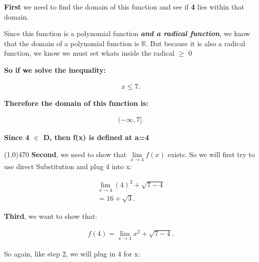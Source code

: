 \documentclass{report}
\begin{document}
        \bigbreak \noindent 
        \textbf{First} we need to find the domain of this function and see if \textbf{4} lies within
        that domain.

        \bigbreak \noindent 
        Since this function is a polynomial function \textbf{\textit{and a radical function}}, 
        we know that the domain of a polynomial function is $\mathbb{R}$. But because it is 
        also a radical function, we know we must set whats inside the radical $\geq$ 0 

        \bigbreak \noindent 
        \textbf{So if we solve the inequality:} 

        \begin{align*}
            x \leq 7
        .\end{align*}

        \bigbreak \noindent 
        \textbf{Therefore the domain of this function is:}

        \begin{align*}
            (-\infty, 7] 
        .\end{align*} 

        \bigbreak \noindent 

        \bigbreak \noindent 
        \textbf{Since 4 $\in$ D, then f(x) is defined at a=4}

        \bigbreak \noindent 
        \line(1,0){470}
        \bigbreak \noindent \bigbreak \noindent  
        \textbf{Second}, we need to show that $\lim\limits_{x \to 4}{f \left(x\right)}$ exists. 
        So we will first try to use direct Substitution and plug 4 into x:

        \begin{align*}
            \lim\limits_{x \to 4}{ \left(4\right)^2 + \sqrt{7-4}} \\ 
            = 16 + \sqrt{3}
        .\end{align*}

        \bigbreak \noindent \bigbreak \noindent 
        \textbf{Third}, we want to show that:
        
        \begin{align*}
            f \left(4\right) = \lim\limits_{x  \to 4}{x^2 + \sqrt{7-4}}
        .\end{align*}

        \bigbreak \noindent 
        So again, like step 2, we will plug in 4 for x:
\end{document}
